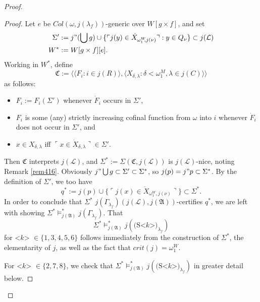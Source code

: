 \documentclass[12pt, twoside]{memoir}
\numberwithin{equation}{section}
\theoremstyle{definition}
\theoremstyle{remark}
\theoremstyle{definition}
\theoremstyle{definition}
\theoremstyle{definition}
\theoremstyle{remark}
\begin{document}
\begin{proof}
\begin{proof}
Let $e$ be $Col(\omega, j(\lambda_f))$-generic over $W[g \times f]$, and set
\begin{align*}
    \Sigma' & := j" (\bigcup g) \cup \{\ulcorner j(y) \in \dot{X}_{\omega_1^W \!\! , j(\nu)} \urcorner : y \in Q_{\nu}\} \subset j(\mathcal{L}) \\
    W^* & := W[g \times f][e] \text{.}
\end{align*} 
Working in $W^*$, define $$\mathfrak{C} := \langle \langle F_i : i \in j(R) \rangle, \langle X_{\delta, \lambda} : \delta < \omega_1^M, \lambda \in j(C) \rangle \rangle$$ as follows:
\begin{itemize}
    \item $F_i := F_i(\Sigma')$ whenever $\dot{F}_i$ occurs in $\Sigma'$,
    \item $F_i$ is some (any) strictly increasing cofinal function from $\omega$ into $i$ whenever $\dot{F}_i$ does not occur in $\Sigma'$, and
    \item $x \in X_{\delta, \lambda}$ iff $\ulcorner x \in \dot{X}_{\delta, \lambda} \urcorner \in \Sigma'$.
\end{itemize}
Then $\mathfrak{C}$ interprets $j(\mathcal{L})$, and $\Sigma^* := \Sigma(\mathfrak{C}, j(\mathcal{L}))$ is $j(\mathcal{L})$-nice, noting Remark \ref{rem416}. Obviously $j" \bigcup g \subset \Sigma' \subset \Sigma^*$, so $j(p) = j" p \subset \Sigma^*$. By the definition of $\Sigma'$, we too have $$q^* := j(p) \cup \{\ulcorner j(x) \in \dot{X}_{\omega_1^W \!\! , j(\nu)} \urcorner\} \subset \Sigma^*.$$ In order to conclude that $\Sigma^*$ $j(\Gamma_{\lambda_f})(j(\mathcal{L}), j(\mathfrak{A}))$-certifies $q^*$, we are left with showing $\Sigma^* \models^*_{j(\mathfrak{A})} j(\Gamma_{\lambda_f})$. That $$\Sigma^* \models^*_{j(\mathfrak{A})} j(\text{(S<} k \text{>)}_{\lambda_f})$$ for <$k$> $\in \{1, 3, 4, 5, 6\}$ follows immediately from the construction of $\Sigma^*$, the elementarity of $j$, as well as the fact that $crit(j) = \omega_1^W$.

For <$k$> $\in \{2, 7, 8\}$, we check that $\Sigma^* \models^*_{j(\mathfrak{A})} j(\text{(S<} k \text{>)}_{\lambda_f})$ in greater detail below. 


\end{proof}
\end{proof}
\end{document}
